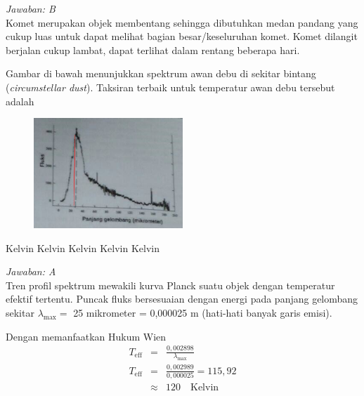 \documentclass[11pt,fleqn, a4paper]{exam}
\begin{document}
\begin{questions}
\textit{Jawaban: B}\\
Komet merupakan objek membentang sehingga dibutuhkan medan pandang yang cukup luas untuk dapat melihat bagian besar/keseluruhan komet. Komet dilangit berjalan cukup lambat, dapat terlihat dalam rentang beberapa hari.

\vspace{0.5cm}
\question Gambar di bawah menunjukkan spektrum awan debu di sekitar bintang (\textit{circumstellar dust}). Taksiran terbaik untuk temperatur awan debu tersebut adalah
\begin{figure}[H]
\centering
\includegraphics[width=0.5\textwidth]{gambar/spektrum.png}
\end{figure}
\begin{choices}
 Kelvin
 Kelvin
 Kelvin
 Kelvin
 Kelvin
\end{choices}

\textit{Jawaban: A}\\
Tren profil spektrum mewakili kurva Planck suatu objek dengan temperatur efektif tertentu. Puncak fluks bersesuaian dengan energi pada panjang gelombang sekitar $\lambda_{\text{max}}=$ 25 mikrometer = 0,000025 m (hati-hati banyak garis emisi). 

Dengan memanfaatkan Hukum Wien
\begin{eqnarray*}
T_{\text{eff}}&=&\frac{0,002898}{\lambda_{\text{max}}}\\
T_{\text{eff}}&=&\frac{0,002989}{0,000025}=115,92\\
&\approx& 120 \quad \text{Kelvin}
\end{eqnarray*}



\end{questions}
\end{document}

